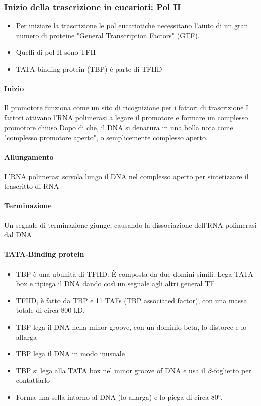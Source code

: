 \documentclass{article}
\begin{document}
\subsubsection{Inizio della trascrizione in eucarioti: Pol II}
\begin{itemize}
    \item Per iniziare la trascrizione le pol eucariotiche necessitano l'aiuto di un gran numero di proteine "General Transcription Factors" (GTF).
    \item Quelli di pol II sono TFII
    \item TATA binding protein (TBP) è parte di TFIID
\end{itemize}
\paragraph{Inizio}
Il promotore funziona come un sito di ricognizione per i fattori di trascrizione
I fattori attivano l'RNA polimerasi a legare il promotore e formare un complesso promotore chiuso
Dopo di che, il DNA si denatura in una bolla nota come "complesso promotore aperto", o semplicemente complesso aperto.
\paragraph{Allungamento}
L'RNA polimerasi scivola lungo il DNA nel complesso aperto per sintetizzare il trascritto di RNA
\paragraph{Terminazione}
Un segnale di terminazione giunge, causando la dissociazione dell'RNA polimerasi dal DNA
\paragraph{TATA-Binding protein}
\begin{itemize}
    \item TBP è una ubunità di TFIID. È composta da due domini simili. Lega TATA box e ripiega il DNA dando così un segnale agli altri general TF
    \item TFIID, è fatto da TBP e 11 TAFs (TBP associated factor), con una massa totale di circa 800 kD.
    \item TBP lega il DNA nella minor groove, con un dominio beta, lo distorce e lo allarga
    \item TBP lega il DNA in modo inusuale
    \item TBP si lega alla TATA box nel minor groove of DNA e usa il $\beta$-foglietto per contattarlo
    \item Forma una sella intorno al DNA (lo allarga) e lo piega di circa 80°.
\end{itemize}
\end{document}

